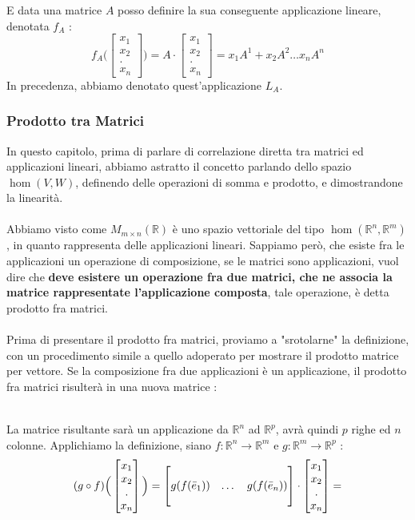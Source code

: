 \documentclass[12pt, letterpaper]{article}
\newcommand{\R}{{\mathbb R}}
\newcommand{\acc}{\\\hphantom{}\\}
\begin{document}
E data una matrice \(A\) posso definire la sua conseguente applicazione lineare, denotata \(f_A\) :
$$
f_A\Big(\begin{bmatrix}
    x_1\\x_2\\.\\x_n
\end{bmatrix}\Big)=A\cdot \begin{bmatrix}
    x_1\\x_2\\.\\x_n
\end{bmatrix}=x_1A^1+x_2A^2\dots x_nA^n
$$
In precedenza, abbiamo denotato quest'applicazione \(L_A\).
\subsubsection{Prodotto tra Matrici}
In questo capitolo, prima di parlare di correlazione diretta tra matrici ed applicazioni lineari, abbiamo astratto il concetto 
parlando dello spazio \(\hom(V,W)\), definendo delle operazioni di somma e prodotto, e dimostrandone la linearità.\acc Abbiamo visto 
come \(M_{m\times n}(\R)\) è uno spazio vettoriale del tipo \(\hom(\R^n,\R^m)\), in quanto rappresenta delle applicazioni 
lineari. Sappiamo però, che esiste fra le applicazioni un operazione di composizione, se le matrici sono applicazioni, vuol 
dire che \textbf{deve esistere un operazione fra due matrici, che ne associa la matrice rappresentate l'applicazione composta}, 
tale operazione, è detta prodotto fra matrici.\acc 
Prima di presentare il prodotto fra matrici, proviamo a "srotolarne" la definizione, con un procedimento simile a quello 
adoperato per mostrare il prodotto matrice per vettore. Se la composizione fra due applicazioni è un applicazione, il 
prodotto fra matrici risulterà in una nuova matrice :
\begin{figure}[h]
    \end{figure}\\
La matrice risultante sarà un applicazione da \(\R^n\) ad \(\R^p\), avrà quindi \(p\) righe ed \(n\) colonne. Applichiamo la 
definizione, siano \(f:\R^n\rightarrow \R^m\) e  \(g:\R^m\rightarrow \R^p\) : 
$$
(g\circ f)\Big(\begin{bmatrix}
    x_1\\x_2\\.\\x_n
\end{bmatrix}\Big)=\begin{bmatrix}             
    \hphantom{}&\hphantom{}&\hphantom{}\\
    g(f(\bar e_1))&\dots&g(f(\bar e_n))\\
    \hphantom{}&\hphantom{}&\hphantom{}
\end{bmatrix}\cdot \begin{bmatrix}
    x_1\\x_2\\.\\x_n
\end{bmatrix}=
$$
\end{document}
